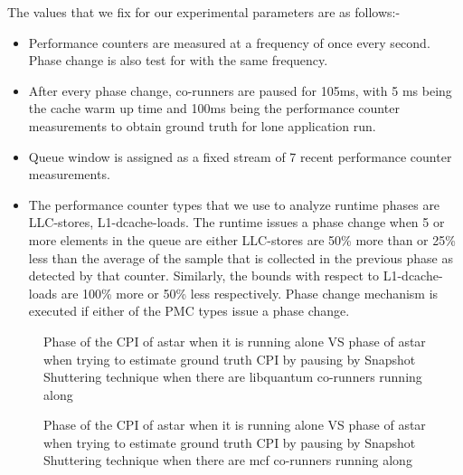 \documentclass[pageno]{jpaper}
\begin{document}
The values that we fix for our experimental parameters are as follows:-
\begin{itemize}
\item Performance counters are measured at a frequency of once every second. Phase change is also test for with the same frequency.

\item After every phase change, co-runners are paused for 105ms, with 5 ms being the cache warm up time and 100ms being the performance counter measurements to obtain ground truth for lone application run. 

\item Queue window is assigned as a fixed stream of 7 recent performance counter measurements. 

\item The performance counter types that we use to analyze runtime phases are LLC-stores, L1-dcache-loads. The runtime issues a phase change when 5 or more elements in the queue are either LLC-stores are 50\% more than or 25\% less than the average of the sample that is collected in the previous phase as detected by that counter. Similarly, the bounds with respect to L1-dcache-loads are 100\% more or 50\% less respectively. Phase change mechanism is executed if either of the PMC types issue a phase change.
\end{itemize}
\vspace{1.5 mm}
\begin{figure*}
\centering
\begin{minipage}[t]{1\columnwidth}
\centering
{}
\caption{Phase of the CPI of astar when it is running alone VS phase of astar when trying to estimate ground truth CPI by pausing by Snapshot Shuttering technique when there are libquantum co-runners running along}
\label{fig:astarlibl1d}
\end{minipage}
\hfill\begin{minipage}[t]{1\columnwidth}
\centering
{}
\caption{Phase of the CPI of astar when it is running alone VS phase of astar when trying to estimate ground truth CPI by pausing by Snapshot Shuttering technique when there are mcf co-runners running along}
\label{fig:astarmcfl1d}
\end{minipage}
\end{figure*}
\end{document}

